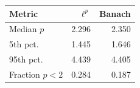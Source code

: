 \begin{tabular}{lrr}
\toprule
Metric & $\ell^p$ & Banach \\
\midrule
Median $p$ & 2.296 & 2.350 \\
5th pct. & 1.445 & 1.646 \\
95th pct. & 4.439 & 4.405 \\
Fraction $p<2$ & 0.284 & 0.187 \\
\bottomrule
\end{tabular}
